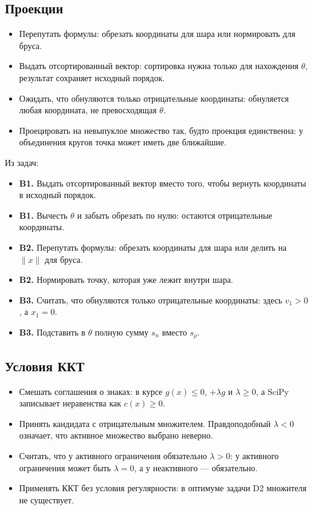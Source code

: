 \documentclass[11pt,a4paper]{article}
\begin{document}
\subsection{Проекции}\label{sub:mistakes-b}

\begin{itemize}[label=\textcolor{hseaccent}{\textbullet}]
  \item Перепутать формулы: обрезать координаты для шара или нормировать для бруса.
  \item Выдать отсортированный вектор: сортировка нужна только для нахождения $\theta$, результат сохраняет исходный порядок.
  \item Ожидать, что обнуляются только отрицательные координаты: обнуляется любая координата, не превосходящая $\theta$.
  \item Проецировать на невыпуклое множество так, будто проекция единственна: у объединения кругов точка может иметь две ближайшие.
\end{itemize}

Из задач:

\begin{itemize}
  \item \textbf{B1.} Выдать отсортированный вектор вместо того, чтобы вернуть координаты в исходный порядок.
  \item \textbf{B1.} Вычесть $\theta$ и забыть обрезать по нулю: остаются отрицательные координаты.
  \item \textbf{B2.} Перепутать формулы: обрезать координаты для шара или делить на $\|x\|$ для бруса.
  \item \textbf{B2.} Нормировать точку, которая уже лежит внутри шара.
  \item \textbf{B3.} Считать, что обнуляются только отрицательные координаты: здесь $v_1 > 0$, а $x_1 = 0$.
  \item \textbf{B3.} Подставить в $\theta$ полную сумму $s_n$ вместо $s_\rho$.
\end{itemize}

\subsection{Условия ККТ}\label{sub:mistakes-c}

\begin{itemize}[label=\textcolor{hseaccent}{\textbullet}]
  \item Смешать соглашения о знаках: в курсе $g(x) \le 0$, $+\lambda g$ и $\lambda \ge 0$, а SciPy записывает неравенства как $c(x) \ge 0$.
  \item Принять кандидата с отрицательным множителем. Правдоподобный $\lambda < 0$ означает, что активное множество выбрано неверно.
  \item Считать, что у активного ограничения обязательно $\lambda > 0$: у активного ограничения может быть $\lambda = 0$, а у неактивного — обязательно.
  \item Применять ККТ без условия регулярности: в оптимуме задачи D2 множителя не существует.
\end{itemize}
\end{document}
